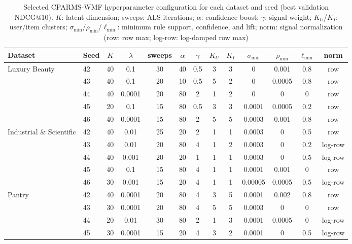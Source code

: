\documentclass[pdflatex,sn-vancouver-num]{sn-jnl}%
\theoremstyle{thmstyleone}%
\theoremstyle{thmstyletwo}%
\theoremstyle{thmstylethree}%
\begin{document}
\clearpage



\begin{table}
\centering
\caption{Selected CPARMS-WMF hyperparameter configuration for each dataset and seed (best
validation NDCG@10). $K$: latent dimension; sweeps: ALS iterations; $\alpha$: confidence
boost; $\gamma$: signal weight; $K_U$/$K_I$: user/item clusters;
$\sigma_{\min}$/$\rho_{\min}$/$\ell_{\min}$: minimum rule support, confidence,
and lift; norm: signal normalization (row: row max; log-row: log-damped row max)}
\label{tab:hp_selected}
\small
\renewcommand{\arraystretch}{1.1}
\begin{tabular*}{\textheight}{@{\extracolsep{\fill}}llccccccccccc@{}}
\toprule
Dataset & Seed & $K$ & $\lambda$ & sweeps & $\alpha$ & $\gamma$ & $K_U$ & $K_I$ & $\sigma_{\min}$ & $\rho_{\min}$ & $\ell_{\min}$ & norm \\
\midrule
Luxury Beauty & 42 & 40 & 0.1 & 30 & 40 & 0.5 & 3 & 3 & 0 & 0.001 & 0.8 & row \\
  & 43 & 40 & 0.1 & 20 & 10 & 0.5 & 5 & 2 & 0 & 0.0005 & 0.8 & row \\
  & 44 & 40 & 0.0001 & 20 & 80 & 2 & 1 & 2 & 0 & 0 & 0 & row \\
  & 45 & 20 & 0.1 & 15 & 80 & 0.5 & 3 & 3 & 0.0001 & 0.0005 & 0.2 & row \\
  & 46 & 40 & 0.0001 & 15 & 80 & 2 & 5 & 5 & 0.0003 & 0.001 & 0.8 & row \\
\midrule
Industrial \& Scientific & 42 & 40 & 0.01 & 25 & 20 & 2 & 1 & 1 & 0.0003 & 0 & 0.5 & row \\
  & 43 & 40 & 0.01 & 20 & 80 & 4 & 1 & 2 & 0.0003 & 0 & 0.2 & log-row \\
  & 44 & 40 & 0.001 & 20 & 20 & 1 & 1 & 1 & 0.0003 & 0 & 0.5 & log-row \\
  & 45 & 40 & 0.1 & 15 & 80 & 4 & 1 & 1 & 0.0001 & 0.001 & 0 & row \\
  & 46 & 30 & 0.001 & 15 & 20 & 4 & 1 & 1 & 0.00005 & 0.0005 & 0.5 & log-row \\
\midrule
Pantry & 42 & 40 & 0.0001 & 20 & 80 & 4 & 3 & 5 & 0.0001 & 0.002 & 0.8 & row \\
  & 43 & 30 & 0.0001 & 20 & 80 & 4 & 5 & 5 & 0.0003 & 0 & 0 & row \\
  & 44 & 20 & 0.01 & 30 & 80 & 2 & 1 & 3 & 0.0001 & 0.0005 & 0 & log-row \\
  & 45 & 30 & 0.0001 & 15 & 20 & 4 & 3 & 2 & 0.0001 & 0 & 0.5 & log-row \\

\end{tabular*}
\end{table}
\end{document}
